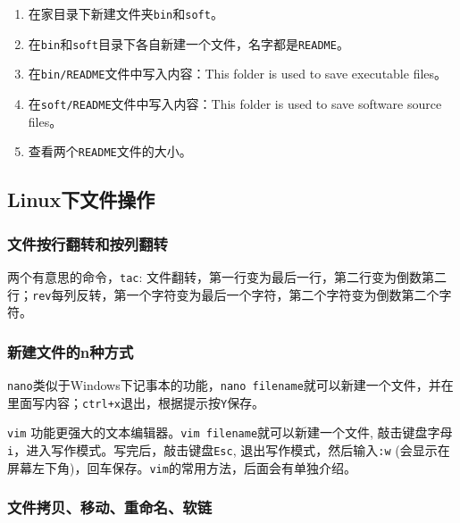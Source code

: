 \documentclass[]{article}
\providecommand{\tightlist}{%
  \setlength{\itemsep}{0pt}\setlength{\parskip}{0pt}}
\numberwithin{figure}{section}
\numberwithin{table}{section}
\begin{document}
\begin{enumerate}
\def\labelenumi{\arabic{enumi}.}
\tightlist
\item
  在家目录下新建文件夹\texttt{bin}和\texttt{soft}。
\item
  在\texttt{bin}和\texttt{soft}目录下各自新建一个文件，名字都是\texttt{README}。
\item
  在\texttt{bin/README}文件中写入内容：This folder is used to save executable files。
\item
  在\texttt{soft/README}文件中写入内容：This folder is used to save software source files。
\item
  查看两个\texttt{README}文件的大小。
\end{enumerate}

\hypertarget{fileoperation}{%
\subsection{Linux下文件操作}\label{fileoperation}}

\hypertarget{tac_rev}{%
\subsubsection{文件按行翻转和按列翻转}\label{tac_rev}}

两个有意思的命令，\texttt{tac}: 文件翻转，第一行变为最后一行，第二行变为倒数第二行；\texttt{rev}每列反转，第一个字符变为最后一个字符，第二个字符变为倒数第二个字符。

\hypertarget{new_file}{%
\subsubsection{新建文件的n种方式}\label{new_file}}

\texttt{nano}类似于Windows下记事本的功能，\texttt{nano\ filename}就可以新建一个文件，并在里面写内容；\texttt{ctrl+x}退出，根据提示按\texttt{Y}保存。

\texttt{vim} 功能更强大的文本编辑器。\texttt{vim\ filename}就可以新建一个文件, 敲击键盘字母\texttt{i}，进入写作模式。写完后，敲击键盘\texttt{Esc}, 退出写作模式，然后输入\texttt{:w} (会显示在屏幕左下角)，回车保存。\texttt{vim}的常用方法，后面会有单独介绍。

\hypertarget{file_cp_mv_rename_link}{%
\subsubsection{文件拷贝、移动、重命名、软链}\label{file_cp_mv_rename_link}}
\end{document}
